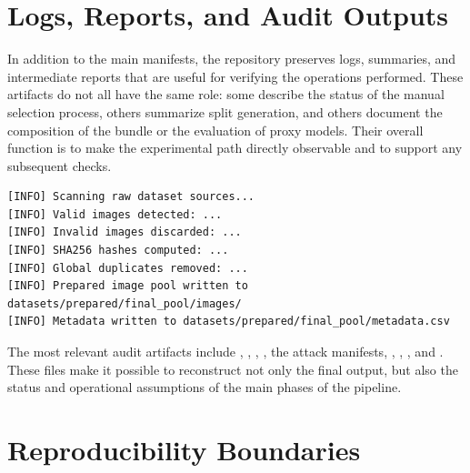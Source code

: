 \section{Logs, Reports, and Audit Outputs}
\label{app:logs-reports-audit-outputs}

In addition to the main manifests, the repository preserves logs, summaries, and
intermediate reports that are useful for verifying the operations performed.
These artifacts do not all have the same role: some describe the status of the
manual selection process, others summarize split generation, and others document
the composition of the bundle or the evaluation of proxy models. Their overall
function is to make the experimental path directly observable and to support any
subsequent checks.

\begin{lstlisting}[caption={Schematic example of output from the dataset preparation phase.}, label={lst:dataset-preparation-log}]
[INFO] Scanning raw dataset sources...
[INFO] Valid images detected: ...
[INFO] Invalid images discarded: ...
[INFO] SHA256 hashes computed: ...
[INFO] Global duplicates removed: ...
[INFO] Prepared image pool written to datasets/prepared/final_pool/images/
[INFO] Metadata written to datasets/prepared/final_pool/metadata.csv
\end{lstlisting}

The most relevant audit artifacts include
, ,
,
, the attack manifests,
,
,
, and
.
These files make it possible to reconstruct not only the final output, but also
the status and operational assumptions of the main phases of the pipeline.


\section{Reproducibility Boundaries}
\label{app:reproducibility-boundaries}

